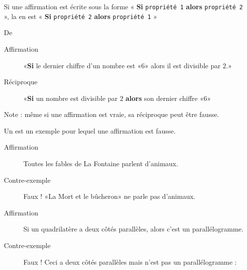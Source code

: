 
\begin{definition}
    Si une affirmation est écrite sous la forme «  {\bf Si} \texttt{propriété 1} {\bf alors} \texttt{propriété 2} », la  en est «  {\bf Si} \texttt{propriété 2} {\bf alors} \texttt{propriété 1} »
\end{definition}
De \cite{XEFooQxuWQb}

\begin{example}
    \begin{description}
        \item[Affirmation] «{\bf Si} le dernier chiffre d'un nombre est «\( 6\)» alors il est divisible par \( 2\).» 
        \item[Réciproque] «{\bf Si} un nombre est divisible par \( 2\) {\bf alors} son dernier chiffre «\( 6\)» 
    \end{description}
    Note : même si une affirmation est vraie, sa réciproque peut être fausse.
\end{example}

\begin{definition}
    Un  est un exemple pour lequel une affirmation est fausse.
\end{definition}

\begin{example}
    \begin{description}
        \item[Affirmation] Toutes les fables de La Fontaine parlent d'animaux.
        \item[Contre-exemple] Faux ! «La Mort et le bûcheron» ne parle pas d'animaux.
    \end{description}
\end{example}

\begin{example}
    \begin{description}
        \item[Affirmation] Si un quadrilatère a deux côtés parallèles, alors c'est un parallélogramme.
        \item[Contre-exemple] Faux ! Ceci a deux côtés parallèles mais n'est pas un parallélogramme :
            \begin{center}
               
            \end{center}
    \end{description}
\end{example}


\begin{multicols}{2}
\end{multicols}

